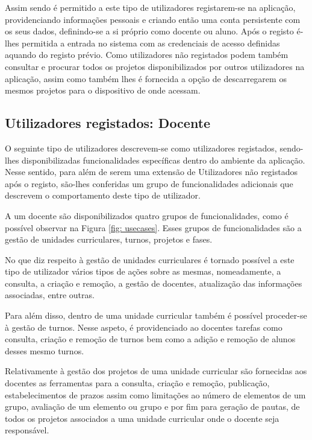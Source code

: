 Assim sendo é permitido a este tipo de utilizadores registarem-se na aplicação, providenciando informações
pessoais e criando então uma conta persistente com os seus dados, definindo-se a si próprio como
docente ou aluno. Após o registo é-lhes permitida a entrada no sistema com as credenciais de acesso
definidas aquando do registo prévio. Como utilizadores não registados podem também consultar e procurar
todos os projetos disponibilizados por outros utilizadores na aplicação, assim como também lhes é fornecida
a opção de descarregarem os mesmos projetos para o dispositivo de onde acessam.

\subsection{Utilizadores registados: Docente}

O seguinte tipo de utilizadores descrevem-se como utilizadores registados, sendo-lhes 
disponibilizadas funcionalidades específicas dentro do ambiente da aplicação. Nesse sentido, para 
além de serem uma extensão de Utilizadores não registados após o registo, são-lhes conferidas um
grupo de funcionalidades adicionais que descrevem o comportamento deste tipo de utilizador.

A um docente são disponibilizados quatro grupos de funcionalidades, como é possível observar na Figura
\ref{fig: usecases}. Esses grupos de funcionalidades são a gestão de unidades curriculares, turnos, 
projetos e fases.

No que diz respeito à gestão de unidades curriculares é tornado possível a este tipo 
de utilizador vários tipos de ações sobre as mesmas, nomeadamente, a consulta, a criação e 
remoção, a gestão de docentes, atualização das informações associadas, entre 
outras.

Para além disso, dentro de uma unidade curricular também é possível proceder-se 
à gestão de turnos. Nesse aspeto, é providenciado ao docentes tarefas como consulta, 
criação e remoção de turnos bem como a adição e remoção de alunos desses mesmo 
turnos.

Relativamente à gestão dos projetos de uma unidade curricular são fornecidas 
aos docentes as ferramentas para a consulta, criação e remoção, publicação, 
estabelecimentos de prazos assim como limitações ao número de elementos de um 
grupo, avaliação de um elemento ou grupo e por fim para geração de pautas, de 
todos os projetos associados a uma unidade curricular onde o docente seja 
responsável.

